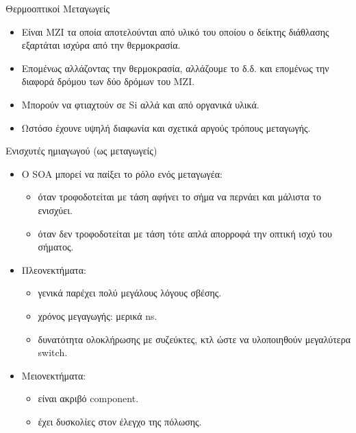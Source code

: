 \documentclass[11pt,aspectratio=169]{beamer}
\begin{document}
\begin{frame}[t]{Θερμοοπτικοί Μεταγωγείς}
\begin{itemize}
\item Είναι MZI τα οποία αποτελούνται από υλικό του οποίου ο δείκτης διάθλασης εξαρτάται ισχύρα από την θερμοκρασία.
\item Επομένως αλλάζοντας την θερμοκρασία, αλλάζουμε το δ.δ. και επομένως την διαφορά δρόμου των δύο δρόμων του MZI.
\item Μπορούν να φτιαχτούν σε Si αλλά και από οργανικά υλικά.
\item Ωστόσο έχουνε υψηλή διαφωνία και σχετικά αργούς τρόπους μεταγωγής.
\end{itemize}
\end{frame}

\begin{frame}[shrink=10,t]{Ενισχυτές ημιαγωγού (ως μεταγωγείς)}
\begin{itemize}
\item Ο SOA μπορεί να παίξει το ρόλο ενός μεταγωγέα:
\begin{itemize}
\item όταν τροφοδοτείται με τάση αφήνει το σήμα να περνάει και μάλιστα το ενισχύει.
\item όταν δεν τροφοδοτείται με τάση τότε απλά απορροφά την οπτική ισχύ του σήματος.
\end{itemize}
\item Πλεονεκτήματα:
\begin{itemize}
\item γενικά παρέχει πολύ μεγάλους λόγους σβέσης.
\item χρόνος μεγαγωγής: μερικά ns.
\item δυνατότητα ολοκλήρωσης με συζεύκτες, κτλ ώστε να υλοποιηθούν μεγαλύτερα switch.
\end{itemize}
\item Μειονεκτήματα:
\begin{itemize}
\item είναι ακριβό component.
\item έχει δυσκολίες στον έλεγχο της πόλωσης.
\end{itemize}
\end{itemize}
\end{frame}
\end{document}
